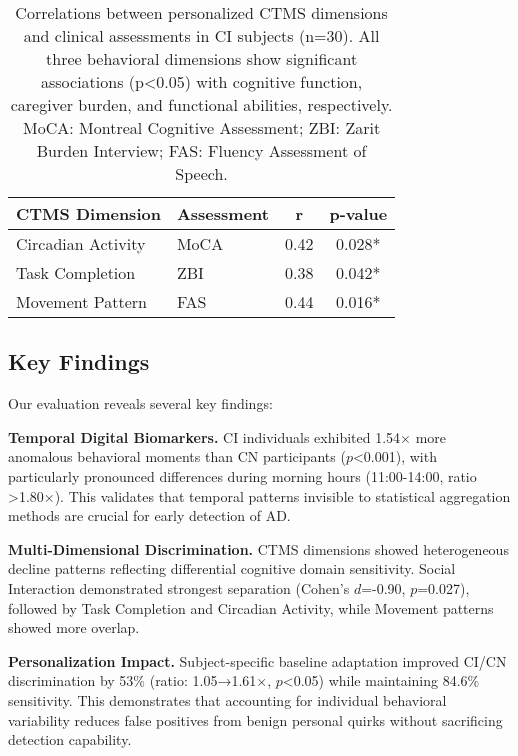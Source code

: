 \documentclass[sigconf, anonymous, 9pt, nonacm]{acmart}
\begin{document}
\begin{table}[t]
\centering
\small
\begin{tabular}{llcc}
\toprule
\textbf{CTMS Dimension} & \textbf{Assessment} & \textbf{r} & \textbf{p-value} \\
\midrule
Circadian Activity & MoCA~\cite{Nasreddine2005MoCA} & 0.42 & 0.028* \\
Task Completion & ZBI~\cite{Zarit1980ZBI} & 0.38 & 0.042* \\
Movement Pattern & FAS~\cite{FAS} & 0.44 & 0.016* \\
\bottomrule
\end{tabular}
\caption{Correlations between personalized CTMS dimensions and clinical assessments in CI subjects (n=30). All three behavioral dimensions show significant associations (p<0.05) with cognitive function, caregiver burden, and functional abilities, respectively. MoCA: Montreal Cognitive Assessment; ZBI: Zarit Burden Interview; FAS: Fluency Assessment of Speech.}
\label{tab:clinical_correlations}
\vspace{-3.5em}
\end{table}



\subsection{Key Findings}

Our evaluation reveals several key findings:

\noindent\textbf{Temporal Digital Biomarkers.} CI individuals exhibited 1.54× more anomalous behavioral moments than CN participants ($p$<0.001), with particularly pronounced differences during morning hours (11:00-14:00, ratio >1.80×). This validates that temporal patterns invisible to statistical aggregation methods are crucial for early detection of AD.

\noindent\textbf{Multi-Dimensional Discrimination.} CTMS dimensions showed heterogeneous decline patterns reflecting differential cognitive domain sensitivity. Social Interaction demonstrated strongest separation (Cohen's $d$=-0.90, $p$=0.027), followed by Task Completion and Circadian Activity, while Movement patterns showed more overlap.

\noindent\textbf{Personalization Impact.} Subject-specific baseline adaptation improved CI/CN discrimination by 53\% (ratio: 1.05→1.61×, $p$<0.05) while maintaining 84.6\% sensitivity. This demonstrates that accounting for individual behavioral variability reduces false positives from benign personal quirks without sacrificing detection capability.
\end{document}

